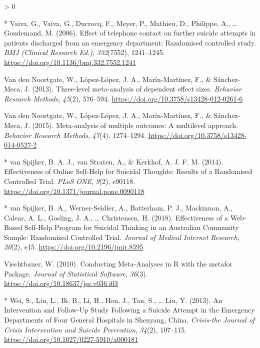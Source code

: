 \documentclass[
  english,
  man]{apa6}
\newlength{\cslhangindent}
\newenvironment{CSLReferences}[2] %
 {%
  \setlength{\parindent}{0pt}
  \ifodd #1 \everypar{\setlength{\hangindent}{\cslhangindent}}\ignorespaces\fi
  \ifnum #2 > 0
  \setlength{\parskip}{#2\baselineskip}
  \fi
 }%
 {}
\begin{document}
\begin{CSLReferences}{1}{0}
\leavevmode\hypertarget{ref-vaiva2006}{}%
* Vaiva, G., Vaiva, G., Ducrocq, F., Meyer, P., Mathieu, D., Philippe, A., \ldots{} Goudemand, M. (2006). Effect of telephone contact on further suicide attempts in patients discharged from an emergency department: Randomised controlled study. \emph{BMJ (Clinical Research Ed.)}, \emph{332}(7552), 1241--1245. \url{https://doi.org/10.1136/bmj.332.7552.1241}

\leavevmode\hypertarget{ref-vandennoortgate2013}{}%
Van den Noortgate, W., López-López, J. A., Marín-Martínez, F., \& Sánchez-Meca, J. (2013). Three-level meta-analysis of dependent effect sizes. \emph{Behavior Research Methods}, \emph{45}(2), 576--594. \url{https://doi.org/10.3758/s13428-012-0261-6}

\leavevmode\hypertarget{ref-vandennoortgate2015}{}%
Van den Noortgate, W., López-López, J. A., Marín-Martínez, F., \& Sánchez-Meca, J. (2015). Meta-analysis of multiple outcomes: A multilevel approach. \emph{Behavior Research Methods}, \emph{47}(4), 1274--1294. \url{https://doi.org/10.3758/s13428-014-0527-2}

\leavevmode\hypertarget{ref-vanspijker2014}{}%
* van Spijker, B. A. J., van Straten, A., \& Kerkhof, A. J. F. M. (2014). Effectiveness of {Online Self}-{Help} for {Suicidal Thoughts}: Results of a {Randomised Controlled Trial}. \emph{PLoS ONE}, \emph{9}(2), e90118. \url{https://doi.org/10.1371/journal.pone.0090118}

\leavevmode\hypertarget{ref-vanspijker2018}{}%
* van Spijker, B. A., Werner-Seidler, A., Batterham, P. J., Mackinnon, A., Calear, A. L., Gosling, J. A., \ldots{} Christensen, H. (2018). Effectiveness of a {Web}-{Based Self}-{Help Program} for {Suicidal Thinking} in an {Australian Community Sample}: Randomized {Controlled Trial}. \emph{Journal of Medical Internet Research}, \emph{20}(2), e15. \url{https://doi.org/10.2196/jmir.8595}

\leavevmode\hypertarget{ref-viechtbauer2010c}{}%
Viechtbauer, W. (2010). Conducting {Meta}-{Analyses} in {R} with the metafor {Package}. \emph{Journal of Statistical Software}, \emph{36}(3). \url{https://doi.org/10.18637/jss.v036.i03}

\leavevmode\hypertarget{ref-wei2013}{}%
* Wei, S., Liu, L., Bi, B., Li, H., Hou, J., Tan, S., \ldots{} Liu, Y. (2013). An {Intervention} and {Follow}-{Up Study Following} a {Suicide Attempt} in the {Emergency Departments} of {Four General Hospitals} in {Shenyang}, {China}. \emph{Crisis-the Journal of Crisis Intervention and Suicide Prevention}, \emph{34}(2), 107--115. \url{https://doi.org/10.1027/0227-5910/a000181}


\end{CSLReferences}
\end{document}
